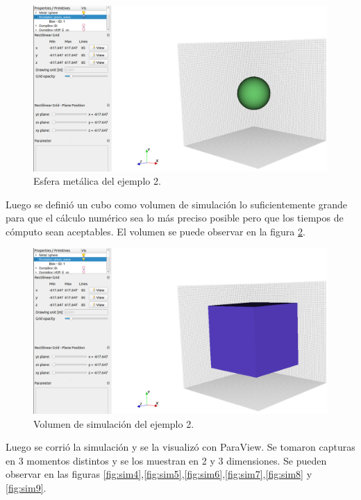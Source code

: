 \documentclass[
    11pt,
    spanish,
	a4paper
]{article}
\begin{document}
\begin{figure}[htbp]
	\centering
	\includegraphics[width=\textwidth]{./img/ejemplo_esfera.png}
	\caption{Esfera metálica del ejemplo 2.}
	\label{fig:sim2}
\end{figure}

Luego se definió un cubo como volumen de simulación lo suficientemente grande
para que el cálculo numérico sea lo más preciso posible pero que los tiempos de
cómputo sean aceptables. El volumen se puede observar en la figura \ref{fig:sim3}.

\begin{figure}[htbp]
	\centering
	\includegraphics[width=\textwidth]{./img/ejemplo_cubo.png}
	\caption{Volumen de simulación del ejemplo 2.}
	\label{fig:sim3}
\end{figure}

Luego se corrió la simulación y se la visualizó con ParaView.
Se tomaron capturas en 3 momentos distintos y se los muestran en 2 y 3
dimensiones.
Se pueden observar en las figuras \ref{fig:sim4},\ref{fig:sim5},\ref{fig:sim6},\ref{fig:sim7},\ref{fig:sim8} y \ref{fig:sim9}.
\end{document}
